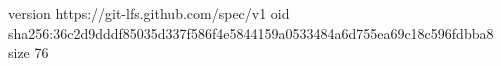 version https://git-lfs.github.com/spec/v1
oid sha256:36c2d9dddf85035d337f586f4e5844159a0533484a6d755ea69c18c596fdbba8
size 76
